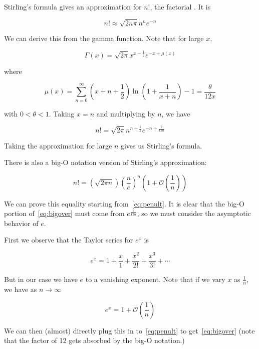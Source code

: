 \documentclass{article}
\begin{document}
Stirling's formula gives an approximation for $n!$, the factorial .  It is 

$$ n! \approx \sqrt{2n\pi} n^n e^{-n} $$

We can derive this from the gamma function.  Note that for large $x$, 

\begin{equation}
 \label{eq:glx}
 \Gamma(x) = \sqrt{2\pi}x^{x-\frac{1}{2}} e^{-x + \mu(x)}
\end{equation}

where

$$ \mu(x) = \sum_{n=0}^\infty \left(x+ n +\frac{1}{2}\right) \ln \left(1+ \frac{1}{x+n} \right) -1 = \frac{\theta}{12x} $$

with $0 < \theta < 1$.  Taking $x=n$ and multiplying by $n$, we have

\begin{equation}
\label{eq:penult}
 n! = \sqrt{2\pi} n^{n+\frac{1}{2}} e^{-n + \frac{\theta}{12n}}
\end{equation}

Taking the approximation for large $n$ gives us Stirling's formula.

There is also a big-O notation version of Stirling's approximation:

\begin{equation}
\label{eq:bigover}
n! = \left(\sqrt{2\pi n}\right)\left(\frac{n}{e}\right)^n \left(1+\mathcal{O}\left(\frac{1}{n}\right)\right)
\end{equation}

We can prove this equality starting from~\eqref{eq:penult}.  It is clear that the big-O portion of~\eqref{eq:bigover} must come from $e^{\frac{\theta}{12n}}$, so we must consider the asymptotic behavior of $e$.  

First we observe that the Taylor series for $e^x$ is 

$$ e^x = 1 + \frac{x}{1} + \frac{x^2}{2!} + \frac {x^3}{3!} + \cdots $$

But in our case we have $e$ to a vanishing exponent.   Note that if we vary $x$ as $\frac{1}{n}$, we have as $ n \longrightarrow \infty $

$$ e^x = 1 + \mathcal{O}\left(\frac{1}{n}\right) $$

We can then (almost) directly plug this in to~\eqref{eq:penult} to get~\eqref{eq:bigover} (note that the factor of 12 gets absorbed by the big-O notation.)
\end{document}

